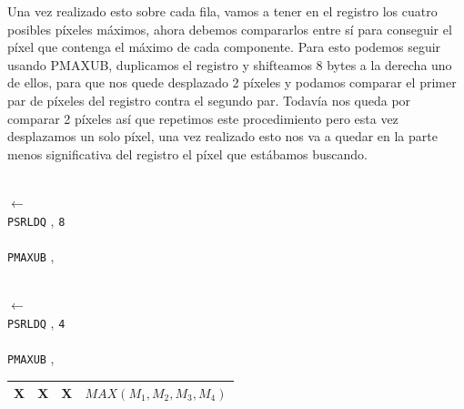 Una vez realizado esto sobre cada fila, vamos a tener en el registro los cuatro posibles píxeles máximos, ahora debemos compararlos entre sí para conseguir el píxel que contenga el máximo de cada componente. Para esto podemos seguir usando PMAXUB, duplicamos el registro y shifteamos 8 bytes a la derecha uno de ellos, para que nos quede desplazado 2 píxeles y podamos comparar el primer par de píxeles del registro contra el segundo par. Todavía nos queda por comparar 2 píxeles así que repetimos este procedimiento pero esta vez desplazamos un solo píxel, una vez realizado esto nos va a quedar en la parte menos significativa del registro el píxel que estábamos buscando.

\begin{minipage}{\linewidth}
	\begin{center}
		  \\
		 $\leftarrow$  \\
		\texttt{PSRLDQ} , \texttt{8} \hfill \\
		  \\

		\texttt{PMAXUB} ,  \hfill

		  \\

		 $\leftarrow$  \\
		\texttt{PSRLDQ} , \texttt{4} \hfill \\
		  \\

		\texttt{PMAXUB} ,  \hfill \\

		 \vspace{0.1cm}
		\begin{tabular}{|C{1cm}|C{1cm}|C{1cm}|C{3.8cm}|}\hline
		X & X & X & $MAX(M_1,M_2,M_3,M_4)$ \\ \hline
		\end{tabular}
		\vspace{0.1cm}

	\end{center}
\end{minipage}


